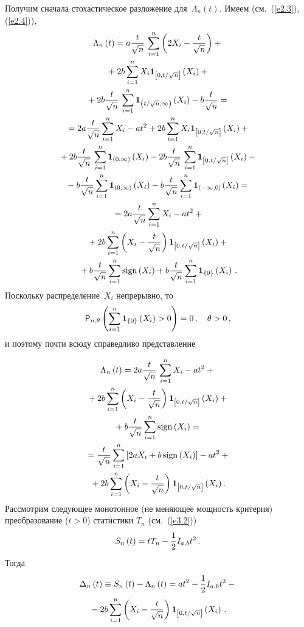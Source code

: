 \begin{multicols}{2}
Получим сначала стохастическое разложение для~$\Lambda_n(t)$. Имеем
(см.~(\ref{e2.3}), (\ref{e2.4})),
\begin{multline*}
\Lambda_{n}\left(t\right)=
a\fr{t}{\sqrt{n}}\,\sum_{i=1}^{n}\left(
2X_{i}-\fr{t}{\sqrt{n}}\right)+{}\\
{}+2b\sum_{i=1}^{n}X_{i} {\IT}_{\left[0,t/\sqrt{n}\right]}
\left(X_{i}\right)+{}\\
{}+2b\fr{t}{\sqrt{n}}\,\sum_{i=1}^{n}{\IT}_{\left(t/\sqrt{n},\infty\right)}
\left(X_{i}\right)-b\fr{t}{\sqrt{n}}={}\\
{}
=2a\fr{t}{\sqrt{n}}\sum_{i=1}^{n}X_{i}-at^{2}+2b\sum_{i=1}^{n}X_{i} {\IT}_{\left[0,t/\sqrt{n}
\right]}\left(X_{i}\right)+{}\\
{}+2b\fr{t}{\sqrt{n}}\,\sum_{i=1}^{n}{\IT}_{\left(0,\infty \right)}
\left(X_{i}\right)-2b\fr{t}{\sqrt{n}}\,\sum_{i=1}^{n}{\IT}_{\left[0,t/\sqrt{n}
\right]}\left(X_{i}\right)-{}\\
{}
-b\fr{t}{\sqrt{n}}\sum_{i=1}^{n}{\IT}_{\left(0,\infty
\right)}\left(X_{i}\right)-b\fr{t}{\sqrt{n}}\sum_{i=1}^{n}{\IT}_{(-\infty ,0]}\left(X_{i}\right)={}\\
{}
=2a\fr{t}{\sqrt{n}}\sum_{i=1}^{n}X_{i}-at^{2}+{}\\
{}+2b\sum_{i=1}^{n}\left(X_{i}-\fr{t}{\sqrt{n}}
\right){\IT}_{\left[0,t/\sqrt{n}\right]}\left(X_{i}
\right)+{}\\
{}
+b\fr{t}{\sqrt{n}}\sum_{i=1}^{n}\mathrm{sign}\left(X_{i}
\right)+b\fr{t}{\sqrt{n}}\sum_{i=1}^{n}{\IT}_{\{ 0\}}
\left(X_{i} \right)\,.
\end{multline*}
Поскольку распределение~$X_i$ непрерывно, то
$$
{\p}_{n,\theta}\left(\sum_{i=1}^{n}{\IT}_{\{ 0\}}\left(X_{i}
\right)>0\right)=0\,,\quad \theta >0\,,
$$
и поэтому почти всюду справедливо представление

\noindent
\begin{multline}
\Lambda_{n} \left(t\right)=2a\fr{t}{\sqrt{n}}\,\sum_{i=1}^{n}X_{i}-at^{2}+{}\\
{}+
2b\sum_{i=1}^{n}\left(X_{i}
-\fr{t}{\sqrt{n}}\right){\IT}_{\left[0,t/\sqrt{n}
\right]}\left(X_{i}\right)+{}\\
{}+
b\fr{t}{\sqrt{n}}\sum_{i=1}^{n}{\mathrm{sign}}\left(X_{i}\right)={}\\
{}=\fr{t}{\sqrt{n}}\sum_{i=1}^{n}\left[2aX_{i}+b\,{\mathrm{sign}}
\left(X_{i}\right)\right]-at^{2}+{}\\
{}+2b\sum_{i=1}^{n}\left(X_{i}-\fr{t}{\sqrt{n}}
\right){\IT}_{\left[0,t/\sqrt{n}\right]}\left(X_{i}
\right). \label{e3.3}
\end{multline}
Рассмотрим следующее монотонное (не меняющее мощность критерия)
преобразование ($t > 0$) статистики  $T_n$ (см.~(\ref{e3.2}))
$$
S_{n} \left(t\right)=tT_{n} -\fr{1}{2}I_{a,b}t^{2}\,.
$$
Тогда
\begin{multline}
\Delta_{n}\left(t\right)\equiv S_{n}\left(t\right)-\Lambda_{n}
\left(t\right)=at^{2}-\fr{1}{2} I_{a,b}t^{2}-{}\\
{}
-2b\sum_{i=1}^{n}\left(X_{i}-\fr{t}{\sqrt{n}}
\right){\IT}_{\left[0,t/\sqrt{n}\right]}\left(X_{i}
\right)\,. \label{e3.4}
\end{multline}



\end{multicols}

